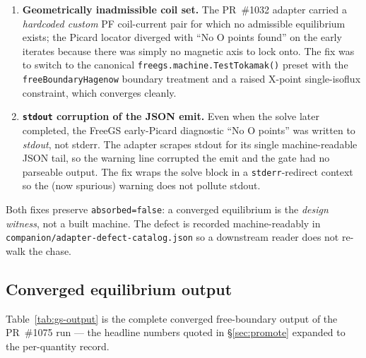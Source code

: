\begin{enumerate}\itemsep0.3em
\item \textbf{Geometrically inadmissible coil set.} The PR~\#1032 adapter
  carried a \emph{hardcoded custom} PF coil-current pair for which no
  admissible equilibrium exists; the Picard locator diverged with ``No O
  points found'' on the early iterates because there was simply no
  magnetic axis to lock onto. The fix was to switch to the canonical
  \verb|freegs.machine.TestTokamak()| preset with the
  \verb|freeBoundaryHagenow| boundary treatment and a raised X-point
  single-isoflux constraint, which converges cleanly.
\item \textbf{\texttt{stdout} corruption of the JSON emit.} Even when the
  solve later completed, the FreeGS early-Picard diagnostic ``No O points''
  was written to \emph{stdout}, not stderr. The adapter scrapes stdout for
  its single machine-readable JSON tail, so the warning line corrupted the
  emit and the gate had no parseable output. The fix wraps the solve block
  in a \texttt{stderr}-redirect context so the (now spurious) warning does
  not pollute stdout.
\end{enumerate}

Both fixes preserve \texttt{absorbed=false}: a converged equilibrium is the
\emph{design witness}, not a built machine. The defect is recorded
machine-readably in \texttt{companion/adapter-defect-catalog.json} so a
downstream reader does not re-walk the chase.

\subsection{Converged equilibrium output}
\label{app:gs-output}

Table~\ref{tab:gs-output} is the complete converged free-boundary output of
the PR~\#1075 run --- the headline numbers quoted in \S\ref{sec:promote}
expanded to the per-quantity record.

